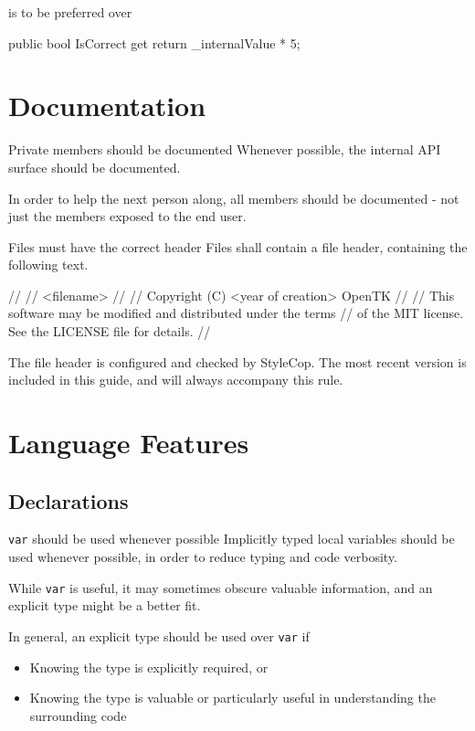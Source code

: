 \documentclass[11pt,a4paper]{article}
\newcounter{rule}[section]
\begin{document}
is to be preferred over

\begin{code}
public bool IsCorrect 
{
    get
    {
        return _internalValue * 5;
    }
}
\end{code}


\section{Documentation}
\begin{should}{Private members should be documented}
Whenever possible, the internal API surface should be documented.
\end{should}

In order to help the next person along, all members should be documented - not just the members exposed to the end user.

\begin{must}{Files must have the correct header}
Files shall contain a file header, containing the following text.
\end{must}

\begin{code}
// 
//  <filename>
//
//  Copyright (C) <year of creation> OpenTK
//
//  This software may be modified and distributed under the terms
//  of the MIT license. See the LICENSE file for details.
//
\end{code}

The file header is configured and checked by StyleCop. The most recent version is included in this guide, and will always accompany this rule.

\section{Language Features}
\subsection{Declarations}
\begin{should}{\texttt{var} should be used whenever possible}
Implicitly typed local variables should be used whenever possible, in order to reduce typing and code verbosity.
\end{should}

While \texttt{var} is useful, it may sometimes obscure valuable information, and an explicit type might be a better fit.

In general, an explicit type should be used over \texttt{var} if
\begin{itemize}
\item Knowing the type is explicitly required, or
\item Knowing the type is valuable or particularly useful in understanding the surrounding code
\end{itemize}
\end{document}
